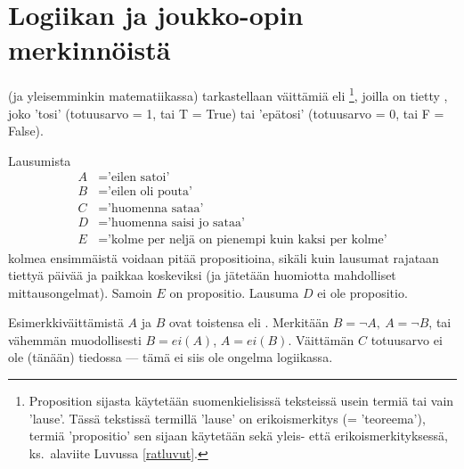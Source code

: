 \section{Logiikan ja joukko-opin merkinnöistä} \label{logiikka}
\alku
{}

 (ja yleisemminkin matematiikassa) tarkastellaan väittämiä eli 
%
\footnote[2]{Proposition sijasta käytetään suomenkielisissä teksteissä usein
termiä  tai vain 'lause'. Tässä tekstissä termillä 'lause' on erikoismerkitys 
(= 'teoreema'), termiä 'propositio' sen sijaan käytetään sekä yleis- että erikoismerkityksessä,
ks.\ alaviite Luvussa \ref{ratluvut}.  },
joilla on tietty
%
, joko 'tosi' (totuusarvo = 1, tai T = True) tai 'epätosi'
(totuusarvo = 0, tai F = False).
\begin{Exa} Lausumista
\begin{align*}
A &= \text{'eilen satoi'} \\
B &= \text{'eilen oli pouta'} \\
C &= \text{'huomenna sataa'} \\
D &= \text{'huomenna saisi jo sataa'} \\
E &= \text{'kolme per neljä on pienempi kuin kaksi per kolme'}
\end{align*}
kolmea ensimmäistä voidaan pitää propositioina, sikäli kuin lausumat rajataan tiettyä päivää ja
paikkaa koskeviksi (ja jätetään huomiotta mahdolliset mittausongelmat). Samoin $E$ on 
propositio. Lausuma $D$ ei ole propositio. \loppu \end{Exa} 
Esimerkkiväittämistä $A$ ja $B$ ovat toistensa
 eli . 
Merkitään $B = \neg A,\ A = \neg B$, tai vähemmän muodollisesti $B = ei(A)$, $A = ei(B)$.
Väittämän $C$ totuusarvo ei ole (tänään) tiedossa --- tämä ei siis ole ongelma logiikassa.

